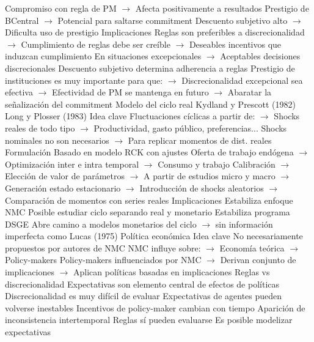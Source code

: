 \documentclass{nuevotema}
\begin{document}
\begin{esquemal}
				\4[] Compromiso con regla de PM
				\4[] $\to$ Afecta positivamente a resultados
				\4[] Prestigio de BCentral
				\4[] $\to$ Potencial para saltarse commitment
				\4[] Descuento subjetivo alto
				\4[] $\to$ Dificulta uso de prestigio
				\4 Implicaciones
				\4[] Reglas son preferibles a discrecionalidad
				\4[] $\to$ Cumplimiento de reglas debe ser creíble
				\4[] $\to$ Deseables incentivos que induzcan cumplimiento
				\4[] En situaciones excepcionales
				\4[] $\to$ Aceptables decisiones discrecionales
				\4[] Descuento subjetivo determina adherencia a reglas
				\4[] Prestigio de instituciones es muy importante para que:
				\4[] $\to$ Discrecionalidad excepcional sea efectiva
				\4[] $\to$ Efectividad de PM se mantenga en futuro
				\4[] $\to$ Abaratar la señalización del commitment
		\2 Modelo del ciclo real
			\3 Kydland y Prescott (1982)
			\3 Long y Plosser (1983)
				\4 Idea clave
				\4[] Fluctuaciones cíclicas a partir de:
				\4[] $\to$ Shocks reales de todo tipo
				\4[] $\to$ Productividad, gasto público, preferencias...
				\4[] Shocks nominales no son necesarios
				\4[] $\to$ Para replicar momentos de dist. reales
				\4 Formulación
				\4[] Basado en modelo RCK con ajustes
				\4[] Oferta de trabajo endógena
				\4[] $\to$ Optimización inter e intra temporal
				\4[] $\to$ Consumo y trabajo
				\4[] Calibración
				\4[] $\to$ Elección de valor de parámetros
				\4[] $\to$ A partir de estudios micro y macro
				\4[] $\to$ Generación estado estacionario
				\4[] $\to$ Introducción de shocks aleatorios
				\4[] $\to$ Comparación de momentos con series reales
				\4 Implicaciones
				\4[] Estabiliza enfoque NMC
				\4[] Posible estudiar ciclo separando real y monetario
				\4[] Estabiliza programa DSGE
				\4[] Abre camino a modelos monetarios del ciclo
				\4[] $\to$ sin información imperfecta como Lucas (1975)
	\1 
		\2 Política económica
			\3 Idea clave
				\4 No necesariamente propuestos por autores de NMC
				\4 NMC influye sobre:
				\4[] $\to$ Economía teórica
				\4[] $\to$ Policy-makers
				\4 Policy-makers influenciados por NMC
				\4[] $\to$ Derivan conjunto de implicaciones
				\4[] $\to$ Aplican políticas basadas en implicaciones
			\3 Reglas vs discrecionalidad
				\4 Expectativas son elemento central de efectos de políticas
				\4 Discrecionalidad es muy difícil de evaluar
				\4[] Expectativas de agentes pueden volverse inestables
				\4[] Incentivos de policy-maker cambian con tiempo
				\4[] Aparición de inconsistencia intertemporal
				\4 Reglas sí pueden evaluarse
				\4[] Es posible modelizar expectativas

\end{esquemal}
\end{document}
